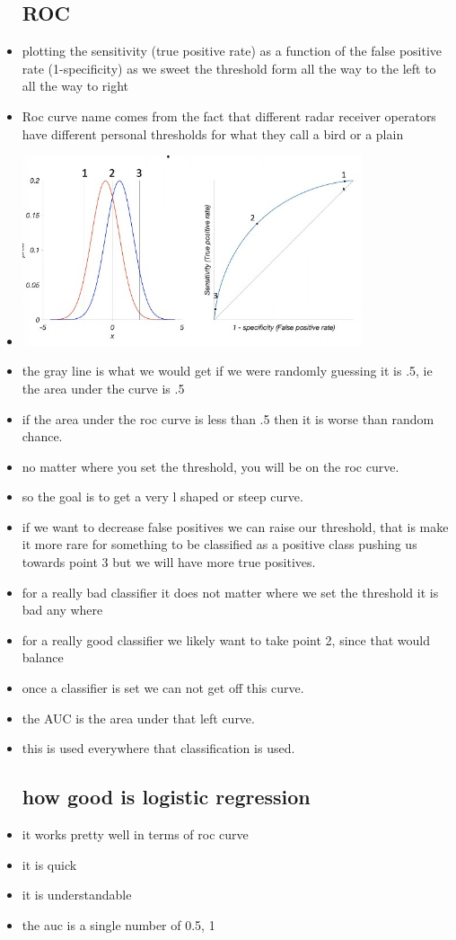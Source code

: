\documentclass{article}
\begin{document}
\begin{itemize}
\subsection{ROC }
\item plotting the sensitivity (true positive rate) as a function of the false positive rate (1-specificity) as we sweet the threshold form all the way to the left to all the way to right 
\item Roc curve name comes from the fact that different radar receiver operators have different personal thresholds for what they call a bird or a plain 
\item \includegraphics[width=10cm]{Final_Review/lecture_10/roc example.jpg}
\item the gray line is what we would get if we were randomly guessing it is .5, ie the area under the curve is .5
\item if the area under the roc curve is less than .5 then it is worse than random chance. 
\item no matter where you set the threshold, you will be on the roc curve. 
\item so the goal is to get a very l shaped or steep curve.
\item if we want to decrease false positives we can raise our threshold, that is make it more rare for something to be classified as a positive class pushing us towards point 3 but we will have more true positives.
\item for a really bad classifier it does not matter where we set the threshold it is bad any where
\item for a really good classifier we likely want to take point 2, since that would balance
\item once a classifier is set we can not get off this curve. 
\item the AUC is the area under that left curve. 
\item this is used everywhere that classification is used.
\subsection{how good is logistic regression}
\item it works pretty well in terms of roc curve 
\item it is quick 
\item it is understandable 
\item the auc is a single number of 0.5, 1


\end{itemize}
\end{document}
